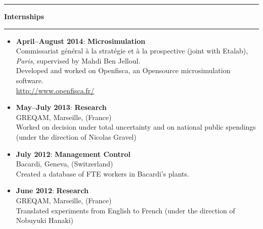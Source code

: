 \documentclass[a4paper,11pt]{article} %
\newcommand{\titre}[1]{%
	\begin{center}
	\rule{\textwidth}{1pt}
	\par\vspace{0.1cm}
        \textbf{\large #1}
	\par\rule{\textwidth}{1pt}
	\end{center}
	}
\begin{document}
\newpage

\titre{Internships}

\begin{itemize}

\item \textbf{April--August 2014}:   \textbf{Microsimulation}\\
Commissariat général à la stratégie et à la prospective (joint with Etalab), \emph{Paris}, supervised by Mahdi Ben Jelloul.\\
Developed and worked on Openfisca, an Opensource microsimulation software.\\
\url{http://www.openfisca.fr/}

\item \textbf{May--July 2013}: \textbf{Research}\\
GREQAM, Marseille, (France)\\
 Worked on decision under total uncertainty and on national public spendings (under the direction of Nicolas Gravel)
 
 \item \textbf{July 2012}: \textbf{Management Control}\\
Bacardi, Geneva, (Switzerland)\\
Created a database of FTE workers in Bacardi's plants. 

 \item \textbf{June 2012}: \textbf{Research}\\
GREQAM, Marseille, (France)\\
 Translated experiments from English to French (under the direction of Nobuyuki Hanaki)


 
\end{itemize}


%
%


\newpage






\newpage
\end{document}
